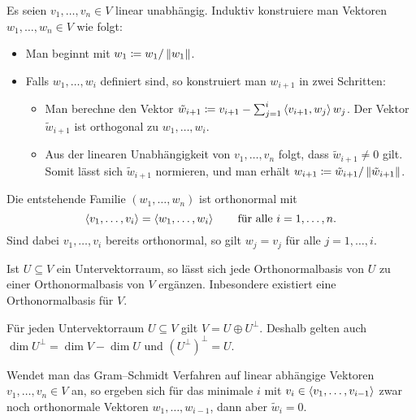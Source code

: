 Es seien $v_1, \dotsc, v_n \in V$ linear unabhängig.
Induktiv konstruiere man Vektoren $w_1, \dotsc, w_n \in V$ wie folgt:
\begin{itemize}
  \item
    Man beginnt mit $w_1 \coloneqq w_1 / \left\| w_1 \right\|$.
  \item
    Falls $w_1, \dotsc, w_i$ definiert sind, so konstruiert man $w_{i+1}$ in zwei Schritten:
    \begin{itemize}
      \item
        Man berechne den Vektor $\tilde{w}_{i+1} \coloneqq v_{i+1} - \sum_{j=1}^i \left\langle v_{i+1}, w_j \right\rangle w_j$.
        Der Vektor $\tilde{w}_{i+1}$ ist orthogonal zu $w_1, \dotsc, w_i$.
      \item
        Aus der linearen Unabhängigkeit von $v_1, \dotsc, v_n$ folgt, dass $\tilde{w}_{i+1} \neq 0$ gilt.
        Somit lässt sich $\tilde{w}_{i+1}$ normieren, und man erhält $w_{i+1} \coloneqq \tilde{w}_{i+1} / \left\| \tilde{w}_{i+1} \right\|$.
    \end{itemize}
\end{itemize}
Die entstehende Familie $(w_1, \dotsc, w_n)$ ist orthonormal mit
\[
    \left\langle v_1, \dotsc, v_i \right\rangle
  = \left\langle w_1, \dotsc, w_i \right\rangle
  \qquad
  \text{für alle $i = 1, \dotsc, n$}.
\]
Sind dabei $v_1, \dotsc, v_i$ bereits orthonormal, so gilt $w_j = v_j$ für alle $j = 1, \dotsc, i$.

\begin{theorem}
  Ist $U \subseteq V$ ein Untervektorraum, so lässt sich jede Orthonormalbasis von $U$ zu einer Orthonormalbasis von $V$ ergänzen.
  Inbesondere existiert eine Orthonormalbasis für $V$.
\end{theorem}

\begin{corollary}
  Für jeden Untervektorraum $U \subseteq V$ gilt $V = U \oplus U^\perp$.
  Deshalb gelten auch $\dim U^\perp = \dim V - \dim U$ und $(U^\perp)^\perp = U$.
\end{corollary}

\begin{remark}
  Wendet man das Gram--Schmidt Verfahren auf linear abhängige Vektoren $v_1, \dotsc, v_n \in V$ an, so ergeben sich für das minimale $i$ mit $v_i \in \left\langle v_1, \dotsc, v_{i-1} \right\rangle$ zwar noch orthonormale Vektoren $w_1, \dotsc, w_{i-1}$, dann aber $\tilde{w}_i = 0$.
\end{remark}



\pagebreak



